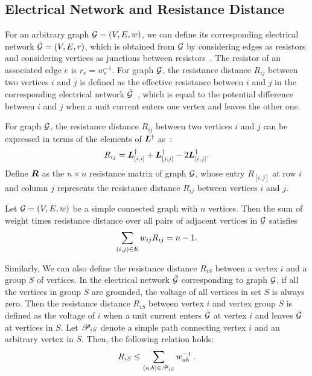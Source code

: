 \documentclass[10pt,twocolumn,twoside]{IEEEtran}
\begin{document}
\subsection{Electrical Network and Resistance Distance}

For an arbitrary graph \(\mathcal{G}=(V,E,w)\), we can define its corresponding electrical network \(\bar{\mathcal{G}}=(V,E,r)\), which is obtained from \(\mathcal{G}\)  by considering edges as resistors and considering vertices as junctions between resistors~\cite{DoSn84}. The resistor of an associated  edge \(e\) is \(r_e=w_e^{-1}\).  For graph  \(\mathcal{G}\), the resistance distance \(R_{ij}\) between two vertices \(i\) and \(j\)  is defined as the effective resistance between \(i\) and \(j\) in the corresponding  electrical network \(\bar{\mathcal{G}}\)~\cite{KlRa93}, which is equal to the potential difference between \(i\) and \(j\) when a unit current enters one vertex and leaves the other one.

For graph \(\mathcal{G}\), the resistance distance \(R_{ij}\) between two vertices \(i\) and \(j\) can be expressed in terms of the elements of \(\boldsymbol{L}^{\dagger}\) as~\cite{KlRa93}:
\begin{equation}\label{EE04}
    R_{ij}={\boldsymbol{L}}_{[i,i]}^{\dagger}+{\boldsymbol{L}}_{[j,j]}^{\dagger}-2{\boldsymbol{L}}_{[i,j]}^{\dagger}.
\end{equation}
Define \(\boldsymbol{R}\) as the \(n \times n\) resistance matrix of graph \(\mathcal{G}\), whose entry \(R_{[i,j]}\) at row \(i\) and column \(j\) represents the resistance distance \(R_{ij}\) between vertices \(i\) and \(j\).

\begin{lemma}\label{Foster} \cite{Te91}
    Let \(\mathcal{G}=(V,E,w)\) be a simple connected graph with \(n\) vertices. Then the sum of  weight times resistance distance over all pairs of adjacent vertices in  \(\mathcal{G}\)  satisfies
    \begin{equation*}
        \sum_{ \left( i,j \right)\in E }w_{ij}R_{ij}=n-1.
    \end{equation*}
\end{lemma}

Similarly, We can also define the resistance distance \(R_{iS}\) between a vertex $i$ and a group  \(S\) of vertices. In the electrical network \(\bar{\mathcal{G}}\) corresponding to graph \(\mathcal{G}\), if all  the vertices in group \(S\) are grounded, the voltage of all vertices in set  \(S\) is always zero.
Then the resistance distance \(R_{iS}\) between vertex \(i\) and vertex group \(S\) is defined as the voltage of \(i\) when a unit current enters \(\bar{\mathcal{G}}\) at vertex $i$ and leaves \(\bar{\mathcal{G}}\) at  vertices in \(S\).  Let \(\mathscr{P}_{iS}\) denote a simple path connecting vertex \(i\) and an arbitrary vertex in \(S\). Then, the following relation holds:
\begin{equation}\label{eq:phy-resist}
    R_{iS}\le \sum_{\left( a,b \right)\in\mathscr{P}_{iS}}w_{ab}^{-1}\,.
\end{equation}
\end{document}
